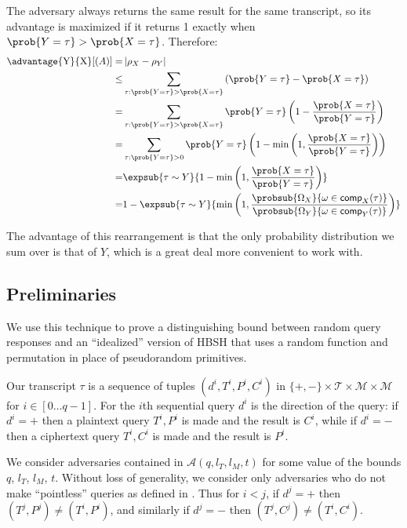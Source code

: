 \documentclass[eprint.tex]{subfiles}
\begin{document}
The adversary always returns the same result for the same transcript, so
its advantage is maximized if it returns 1 exactly when $\prob{Y = \tau} > \prob{X = \tau}$.
Therefore:
\begin{align*}
    \advantage{\textrm{Y}}{\textrm{X}}[(A)] =&
    \left|\rho_X - \rho_Y \right| \\
    \leq & \sum_{\tau: \prob{Y = \tau} > \prob{X = \tau}}
    \left(\prob{Y = \tau} - \prob{X = \tau}\right) \\
    = & \sum_{\tau: \prob{Y = \tau} > \prob{X = \tau}}
    \prob{Y = \tau}\left(1 - \frac{\prob{X = \tau}}{\prob{Y = \tau}}\right) \\
    = & \sum_{\tau: \prob{Y = \tau} > 0}
    \prob{Y = \tau}\left(1 - \min\left(1,\frac{\prob{X = \tau}}{\prob{Y = \tau}}\right)\right) \\
    = & \expsub{\tau \sim Y}{1 - \min
        \left(1,
           \frac{\prob{X = \tau}}{\prob{Y = \tau}}
        \right)} \\
    = & 1 - \expsub{\tau \sim Y}{\min
        \left(1,
           \frac{\probsub{\Omega_X}{\omega \in \comp_X(\tau)}}
           {\probsub{\Omega_Y}{\omega \in \comp_Y(\tau)}}
        \right)}
\end{align*}

The advantage of this rearrangement is that the only probability distribution we sum over is that
of $Y$, which is a great deal more convenient to work with.

\subsection{Preliminaries}
We use this technique to prove a distinguishing bound
between random query responses and
an ``idealized'' version of HBSH that uses a random function and permutation
in place of pseudorandom primitives.

Our transcript $\tau$ is a sequence of tuples
$(d^i, T^i, P^i, C^i)$
in
$\{+, -\} \times \mathcal{T} \times \mathcal{M} \times \mathcal{M}$
for $i \in [0 \ldots q-1]$.
For the $i$th sequential query
$d^i$ is the direction of the query:
if $d^i = +$ then a plaintext query $T^i, P^i$ is made and the result is $C^i$,
while if $d^i = -$ then a ciphertext query $T^i, C^i$ is made and the result is $P^i$.

We consider adversaries contained in $\mathcal{A}(q, l_T, l_M, t)$ for some value of
the bounds $q$, $l_T$, $l_M$, $t$.
Without loss of generality, we consider only adversaries who do not make ``pointless''
queries as defined in \cite{cmc}. Thus for $i < j$, if $d^j = +$ then
$(T^j, P^j) \neq (T^i, P^i)$, and similarly if $d^j = -$ then
$(T^j, C^j) \neq (T^i, C^i)$.
\end{document}
